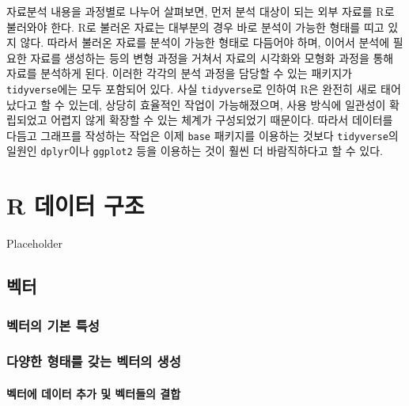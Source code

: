 \documentclass[
]{book}
\begin{document}
자료분석 내용을 과정별로 나누어 살펴보면, 먼저 분석 대상이 되는 외부 자료를 R로 불러와야 한다.
R로 불러온 자료는 대부분의 경우 바로 분석이 가능한 형태를 띠고 있지 않다.
따라서 불러온 자료를 분석이 가능한 형태로 다듬어야 하며,
이어서 분석에 필요한 자료를 생성하는 등의 변형 과정을 거쳐서 자료의 시각화와 모형화 과정을 통해 자료를 분석하게 된다.
이러한 각각의 분석 과정을 담당할 수 있는 패키지가 \texttt{tidyverse}에는 모두 포함되어 있다.
사실 \texttt{tidyverse}로 인하여 R은 완전히 새로 태어났다고 할 수 있는데,
상당히 효율적인 작업이 가능해졌으며, 사용 방식에 일관성이 확립되었고
어렵지 않게 확장할 수 있는 체계가 구성되었기 때문이다.
따라서 데이터를 다듬고 그래프를 작성하는 작업은 이제 \texttt{base} 패키지를 이용하는 것보다
\texttt{tidyverse}의 일원인 \texttt{dplyr}이나 \texttt{ggplot2} 등을 이용하는 것이 훨씬 더 바람직하다고 할 수 있다.

\hypertarget{data-structure}{%
\chapter{R 데이터 구조}\label{data-structure}}

Placeholder

\hypertarget{uxbca1uxd130}{%
\section{벡터}\label{uxbca1uxd130}}

\hypertarget{uxbca1uxd130uxc758-uxae30uxbcf8-uxd2b9uxc131}{%
\subsection{벡터의 기본 특성}\label{uxbca1uxd130uxc758-uxae30uxbcf8-uxd2b9uxc131}}

\hypertarget{uxb2e4uxc591uxd55c-uxd615uxd0dcuxb97c-uxac16uxb294-uxbca1uxd130uxc758-uxc0dduxc131}{%
\subsection{다양한 형태를 갖는 벡터의 생성}\label{uxb2e4uxc591uxd55c-uxd615uxd0dcuxb97c-uxac16uxb294-uxbca1uxd130uxc758-uxc0dduxc131}}

\hypertarget{uxbca1uxd130uxc5d0-uxb370uxc774uxd130-uxcd94uxac00-uxbc0f-uxbca1uxd130uxb4e4uxc758-uxacb0uxd569}{%
\subsubsection{벡터에 데이터 추가 및 벡터들의 결합}\label{uxbca1uxd130uxc5d0-uxb370uxc774uxd130-uxcd94uxac00-uxbc0f-uxbca1uxd130uxb4e4uxc758-uxacb0uxd569}}
\end{document}
